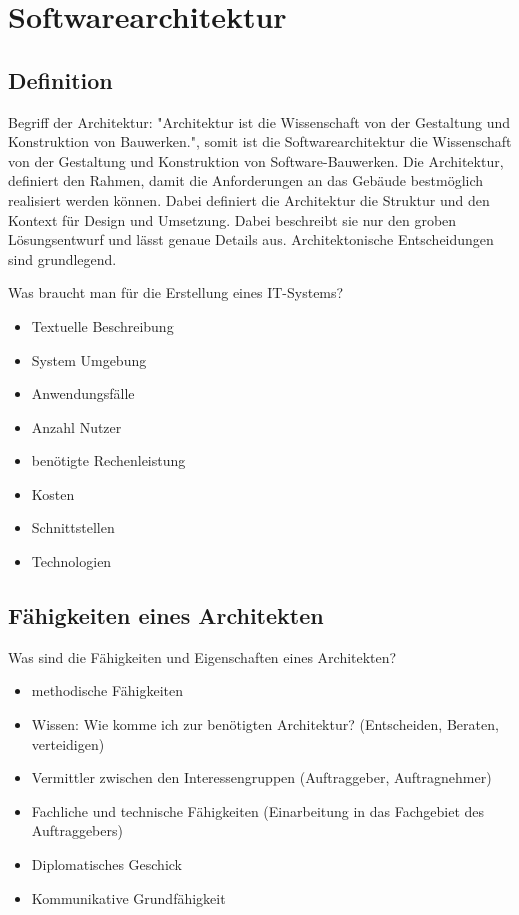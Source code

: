
\chapter{Softwarearchitektur}
\section{Definition}
Begriff der Architektur: "Architektur ist die Wissenschaft von der Gestaltung und Konstruktion von Bauwerken.", somit ist die Softwarearchitektur die Wissenschaft von der Gestaltung und Konstruktion von Software-Bauwerken. Die Architektur, definiert den Rahmen, damit die Anforderungen an das Gebäude bestmöglich realisiert werden können. Dabei definiert die Architektur die Struktur und den Kontext für Design und Umsetzung. Dabei beschreibt sie nur den groben Lösungsentwurf und lässt genaue Details aus. Architektonische Entscheidungen sind grundlegend.

Was braucht man für die Erstellung eines IT-Systems?

\begin{itemize}
	\item Textuelle Beschreibung
	\item System Umgebung
	\item Anwendungsfälle
	\item Anzahl Nutzer
	\item benötigte Rechenleistung
	\item Kosten
	\item Schnittstellen
	\item Technologien
\end{itemize}

\section{Fähigkeiten eines Architekten}
Was sind die Fähigkeiten und Eigenschaften eines Architekten?
\begin{itemize}
	\item methodische Fähigkeiten
	\item Wissen: Wie komme ich zur benötigten Architektur? (Entscheiden, Beraten, verteidigen)
	\item Vermittler zwischen den Interessengruppen (Auftraggeber, Auftragnehmer)
	\item Fachliche und technische Fähigkeiten (Einarbeitung in das Fachgebiet des Auftraggebers)
	\item Diplomatisches Geschick
	\item Kommunikative Grundfähigkeit
\end{itemize}

